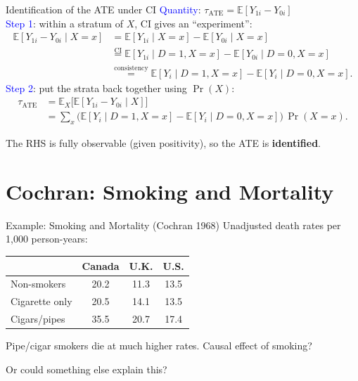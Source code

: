\documentclass[xcolor=dvipsnames]{beamer}
\newcommand\E{\mathbb{E}}
\begin{document}
\begin{frame}[t]{Identification of the ATE under CI}
\small
{} \textcolor{Blue}{Quantity}: $\tau_{\text{ATE}} = \E[Y_{1i} - Y_{0i}]$\\[6pt]

 \textcolor{Blue}{Step 1}: within a stratum of $X$, CI gives an ``experiment'':
\footnotesize
\begin{align*}
\E[Y_{1i} - Y_{0i} \mid X\!=\!x]
  &= \E[Y_{1i} \mid X\!=\!x] - \E[Y_{0i} \mid X\!=\!x]\\
  &\stackrel{\text{CI}}{=} \E[Y_{1i} \mid D\!=\!1, X\!=\!x] - \E[Y_{0i} \mid D\!=\!0, X\!=\!x]\\
  &\stackrel{\text{consistency}}{=} \E[Y_i \mid D\!=\!1, X\!=\!x] - \E[Y_i \mid D\!=\!0, X\!=\!x].
\end{align*}
\medskip
{} \textcolor{Blue}{Step 2}: put the strata back together using $\Pr(X)$:
\footnotesize
\begin{align*}
\tau_{\text{ATE}}
  &= \E_X\!\big[\E[Y_{1i} - Y_{0i} \mid X]\big]\\
  &= \sum_x \big(\E[Y_i \mid D\!=\!1, X\!=\!x] - \E[Y_i \mid D\!=\!0, X\!=\!x]\big)\,\Pr(X\!=\!x).
\end{align*}

\small
{} The RHS is fully observable (given positivity), so the ATE is \textbf{identified}.\\[6pt]

 
\end{frame}


\section{Cochran: Smoking and Mortality}

\begin{frame}{Example: Smoking and Mortality (Cochran 1968)}
\small
Unadjusted death rates per 1{,}000 person-years:

\begin{center}
\begin{tabular}{@{} l c c c @{}}
\toprule
 & Canada & U.K. & U.S.\\
\midrule
Non-smokers     & 20.2 & 11.3 & 13.5 \\
Cigarette only  & 20.5 & 14.1 & 13.5 \\
Cigars/pipes    & 35.5 & 20.7 & 17.4 \\
\bottomrule
\end{tabular}
\end{center}

\bigskip
{} Pipe/cigar smokers die at much higher rates.  Causal effect of smoking?

 \medskip
Or could something else explain this?
\end{frame}
\end{document}
